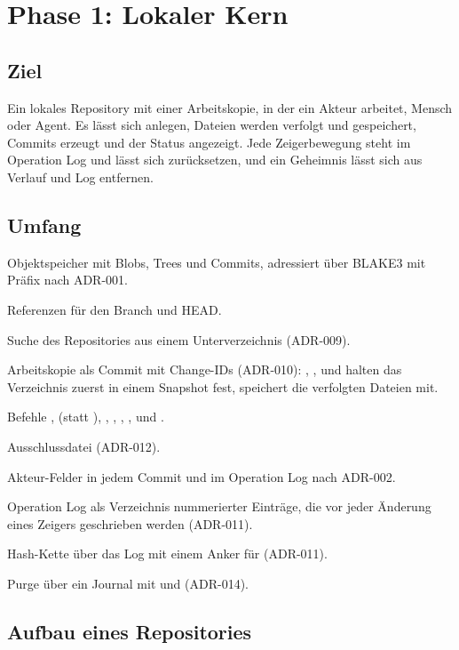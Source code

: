 \chapter[chap:phase1]{Phase 1: Lokaler Kern}

\section{Ziel}

Ein lokales Repository mit einer Arbeitskopie, in der ein Akteur arbeitet, Mensch oder Agent.
Es lässt sich anlegen, Dateien werden verfolgt und gespeichert, Commits erzeugt
und der Status angezeigt.
Jede Zeigerbewegung steht im Operation Log und lässt sich zurücksetzen,
und ein Geheimnis lässt sich aus Verlauf und Log entfernen.

\section{Umfang}

\startitemize
\item Objektspeicher mit Blobs, Trees und Commits, adressiert über BLAKE3 mit Präfix nach ADR-001.
\item Referenzen für den Branch  und HEAD.
\item Suche des Repositories aus einem Unterverzeichnis (ADR-009).
\item Arbeitskopie als Commit mit Change-IDs (ADR-010): , ,
 und  halten das Verzeichnis zuerst in einem Snapshot fest,
 speichert die verfolgten Dateien mit.
\item Befehle ,  (statt ), , ,
, ,  und .
\item Ausschlussdatei  (ADR-012).
\item Akteur-Felder in jedem Commit und im Operation Log nach ADR-002.
\item Operation Log als Verzeichnis nummerierter Einträge, die vor jeder Änderung eines
Zeigers geschrieben werden (ADR-011).
\item Hash-Kette über das Log mit einem Anker für  (ADR-011).
\item Purge über ein Journal mit  und  (ADR-014).
\stopitemize

\section[sec:layout]{Aufbau eines Repositories}

